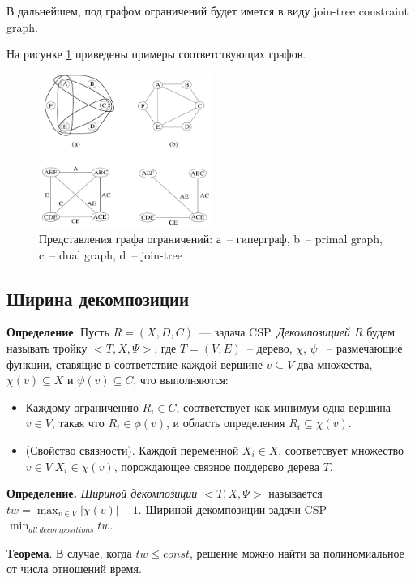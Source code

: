 \documentclass[12pt]{article}
\begin{document}
В дальнейшем, под графом ограничений будет имется в виду join-tree constraint graph.

На рисунке \ref{fig:constraint_graph} приведены примеры соответствующих графов.

\begin{figure}[htb]
\centering
\includegraphics[width=0.50\textwidth]{constraint_graph.png}
\caption{Представления графа ограничений: а~-- гиперграф, b~-- primal graph, c~-- dual graph, d~-- join-tree }
\label{fig:constraint_graph}
\end{figure}


\subsection{Ширина декомпозиции}
\textbf{Определение}. Пусть $R = (X, D, C)$~--- задача CSP. \textit{Декомпозицией $R$} 
будем называть тройку $< T, X, \Psi >$, где $T = (V, E)$~-- дерево, $\chi$, $\psi$ ~-- 
размечающие функции, ставящие в соответствие каждой вершине $v \subseteq V$ два множества, $\chi(v) \subseteq X$
и $\psi(v) \subseteq C$, что выполняются:
\begin{itemize}
\item Каждому ограничению $R_i \in C$, соответствует как минимум одна вершина $v \in V$,
такая что $R_i \in \phi(v)$, и область определения $R_i \subseteq \chi(v)$.
\item (Свойство связности). 
Каждой переменной $X_i \in X$, соответсвует множество ${v \in V |X_i \in \chi(v)}$, порождающее
связное поддерево дерева $T$. 
\end{itemize}

\textbf{Определение.}
\textit{Шириной декомпозиции $ < T, X, \Psi >$} называется $tw = \max_{v \in V}{|\chi(v)| - 1}$.
Шириной декомпозиции задачи CSP~-- $\min_{all~decompositions}{tw}$.


\textbf{Теорема}. В случае, когда $tw \leq const$, 
решение можно найти за полиномиальное от числа отношений время. \cite{CSP10}
\end{document}
